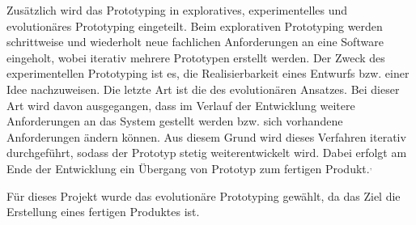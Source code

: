 Zusätzlich wird das Prototyping in exploratives, experimentelles und evolutionäres Prototyping eingeteilt.
Beim explorativen Prototyping werden schrittweise und wiederholt neue fachlichen Anforderungen an eine Software eingeholt, wobei iterativ mehrere Prototypen erstellt werden. 
Der Zweck des experimentellen Prototyping ist es, die Realisierbarkeit eines Entwurfs bzw. einer Idee nachzuweisen.
Die letzte Art ist die des evolutionären Ansatzes. 
Bei dieser Art wird davon ausgegangen, dass im Verlauf der Entwicklung weitere Anforderungen an das System gestellt werden bzw. sich vorhandene Anforderungen ändern können. 
Aus diesem Grund wird dieses Verfahren iterativ durchgeführt, sodass der Prototyp stetig weiterentwickelt wird. 
Dabei erfolgt am Ende der Entwicklung ein Übergang von Prototyp zum fertigen Produkt.\autocite[Vgl.][S. 370]{MS-Alpar.2019}$^,$\autocite[Vgl.][S. 6-12]{MS-Floyd.1984} 

Für dieses Projekt wurde das evolutionäre Prototyping gewählt, da das Ziel die Erstellung eines fertigen Produktes ist.
